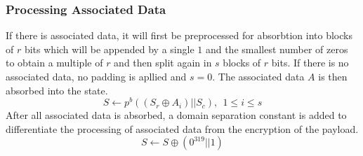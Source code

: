 \subsubsection{Processing Associated Data}
If there is associated data, it will first be preprocessed for absorbtion into blocks of $r$ bits which will be appended by a single $1$ and the smallest number of zeros to obtain a multiple of $r$ and then split again in $s$ blocks of $r$ bits. If there is no associated data, no padding is apllied and $s=0$.
\sloppy
The associated data $A$ is then absorbed into the state.
\[
S \leftarrow p^b((S_r \oplus A_i) || S_c),\ \ 1 \leq i \leq s
\]
After all associated data is absorbed, a domain separation constant is added to differentiate the processing of associated data from the encryption of the payload. \cite[Chapter 2.4.2]{DBLP:journals/joc/DobraunigEMS21}
$$S \leftarrow S \oplus (0^{319} || 1)$$

